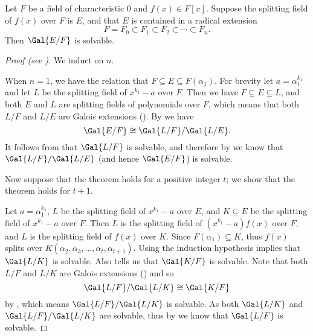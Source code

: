 \begin{theorem}\label{thrm-solvable-by-radicals-implies-solvable-group}
    Let $F$ be a field of characteristic 0 and $f(x) \in F[x]$. Suppose the splitting field of $f(x)$ over $F$ is $E$, and that $E$ is contained in a radical extension
    \[
        F = F_0 \subset F_1 \subset F_2 \subset \cdots \subset F_n.
    \]
    Then $\Gal{E/F}$ is solvable.
\end{theorem}
\begin{proof}[Proof (see {\cite[Theorem 32.5]{gallian_2016}})]
    We induct on $n$.

    When $n = 1$, we have the relation that $F \subseteq E \subseteq F(\alpha_1)$. For brevity let $a = \alpha_1^{k_1}$ and let $L$ be the splitting field of $x^{k_1} - a$ over $F$. Then we have $F \subseteq E \subseteq L$, and both $E$ and $L$ are splitting fields of polynomials over $F$, which means that both $L/F$ and $L/E$ are Galois extensions (). By  we have
    \[
        \Gal{E/F} \cong \Gal{L/F}/\Gal{L/E}.
    \]
    It follows from  that $\Gal{L/F}$ is solvable, and therefore by  we know that $\Gal{L/F}/\Gal{L/E}$ (and hence $\Gal{E/F}$) is solvable.

    Now suppose that the theorem holds for a positive integer $t$; we show that the theorem holds for $t + 1$.

    Let $a = \alpha_1^{k_1}$, $L$ be the splitting field of $x^{k_1} - a$ over $E$, and $K \subseteq E$ be the splitting field of $x^{k_1} - a$ over $F$. Then $L$ is the splitting field of $(x^{k_1}-a)f(x)$ over $F$, and $L$ is the splitting field of $f(x)$ over $K$. Since $F(\alpha_1) \subseteq K$, thus $f(x)$ splits over $K(\alpha_2, \alpha_3, \dots, \alpha_t, \alpha_{t+1})$. Using the induction hypothesis implies that $\Gal{L/K}$ is solvable. Also  tells us that $\Gal{K/F}$ is solvable. Note that both $L/F$ and $L/K$ are Galois extensions () and so
    \[
        \Gal{L/F}/\Gal{L/K} \cong \Gal{K/F}
    \]
    by , which means $\Gal{L/F}/\Gal{L/K}$ is solvable. As both $\Gal{L/K}$ and $\Gal{L/F}/\Gal{L/K}$ are solvable, thus by  we know that $\Gal{L/F}$ is solvable.
    

\end{proof}

